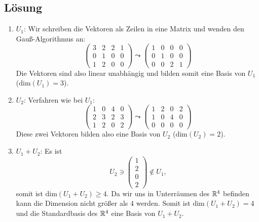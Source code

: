 \subsection{Lösung}
\begin{enumerate}
	\item \( U_1 \): Wir schreiben die Vektoren als Zeilen in eine Matrix und wenden den Gauß-Algorithmus an:
	\begin{equation*}
	 	\begin{pmatrix}
	 		3 & 2 & 2 & 1 \\
	 		0 & 1 & 0 & 0 \\
	 		1 & 2 & 0 & 0 
	 	\end{pmatrix} \leadsto \begin{pmatrix}
	 		1 & 0 & 0 & 0 \\
	 		0 & 1 & 0 & 0 \\
	 		0 & 0 & 2 & 1 
	 	\end{pmatrix}
	 \end{equation*} 
	 Die Vektoren sind also linear unabhängig und bilden somit eine Basis von \( U_1 \) (\( \text{dim}(U_1) = 3 \)).

	 \item \( U_2 \): Verfahren wie bei \( U_1 \):
	 \begin{equation*}
	 	\begin{pmatrix}
	 		1 & 0 & 4 & 0 \\
	 		2 & 3 & 2 & 3 \\
	 		1 & 2 & 0 & 2
	 	\end{pmatrix} \leadsto \begin{pmatrix}
	 		1 & 2 & 0 & 2 \\
	 		1 & 0 & 4 & 0 \\
	 		0 & 0 & 0 & 0
	 	\end{pmatrix}
	 \end{equation*}
	 Diese zwei Vektoren bilden also eine Basis von \( U_2 \) (\( \text{dim}(U_2) = 2 \)).

	 \item \( U_1 + U_2 \): Es ist
	 \begin{equation*}
	  	U_2 \ni \begin{pmatrix}
	  		1 \\ 2 \\ 0 \\ 2
	  	\end{pmatrix} \not \in U_1 \text{,}
	  \end{equation*}
	  somit ist \( \text{dim}(U_1 + U_2) \geq 4 \). Da wir uns in Unterräumen des \( \mathbb{R}^4 \) befinden kann die Dimension nicht größer als \( 4 \) werden. Somit ist \( \text{dim}(U_1 + U_2) = 4 \) und die Standardbasis des \( \mathbb{R}^4 \) eine Basis von \( U_1 + U_2 \).
\end{enumerate}

